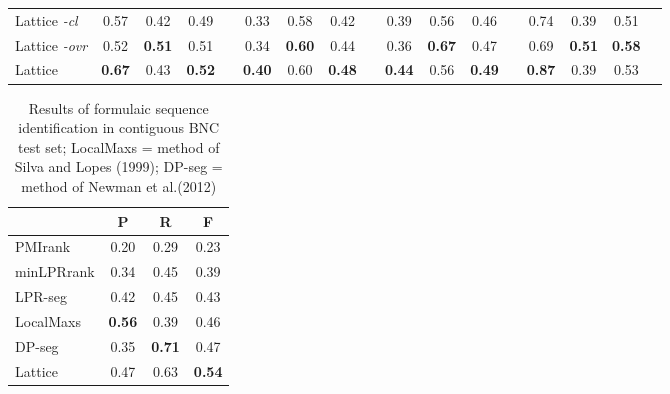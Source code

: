 \documentclass[11pt,letterpaper]{article}
\makeatletter
\def \al {al.\@ }
\makeatother
\begin{document}
\begin{table}[!bt]
\begin{center}
\begin{tabular}{lcccccccccccccccc}
	Lattice \emph{-cl} & 0.57& 0.42 & 0.49 & & 0.33& 0.58 & 0.42 & & 0.39 & 0.56 & 0.46 & & 0.74 & 0.39 & 0.51 \\  	 
			
	Lattice \emph{-ovr} & 0.52& \bf{0.51} & 0.51 & & 0.34& \bf{0.60} & 0.44& & 0.36 & \bf{0.67} & 0.47 & & 0.69 & \bf{0.51} & \bf{0.58} \\  
			
				Lattice & \bf{0.67} & 0.43 & \bf{0.52} & & \bf{0.40}& 0.60 & \bf{0.48} & &\bf{0.44} & 0.56 & \bf{0.49} & & \bf{0.87} & 0.39 & 0.53 \\ 
            \hline
           \hline                  

 \end{tabular}

 \end{center}


 \end{table}


 \begin{table}[!bt]
 
 \begin{center}
  \caption{ Results of formulaic sequence identification in contiguous BNC test set; LocalMaxs = method of Silva and Lopes (1999); DP-seg = method of Newman et \al (2012)}
	\label{tab:BNC}
	
	 \begin{tabular}{lccc}

       \hline
			& P & R & F\\
			 \hline
			PMIrank & 0.20 & 0.29 & 0.23 \\
			minLPRrank & 0.34 & 0.45 & 0.39 \\
			LPR-seg & 0.42 & 0.45 & 0.43 \\
			LocalMaxs & \bf{0.56} & 0.39 & 0.46 \\
			DP-seg & 0.35 & \bf{0.71} & 0.47 \\
			Lattice & 0.47 & 0.63 & \bf{0.54} \\
       \hline
 \end{tabular}

 \end{center}

 \end{table}	
\end{document}
